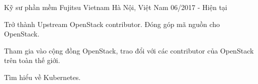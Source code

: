 \begin{cventries}
  \cventry
    {Kỹ sư phần mềm} %
    {Fujitsu Vietnam} %
    {Hà Nội, Việt Nam} %
    {06/2017 - Hiện tại} %
    {
      \begin{cvitems} %
        \item {Trở thành Upstream OpenStack contributor. Đóng góp mã nguồn cho OpenStack.}
        \item {Tham gia vào cộng đồng OpenStack, trao đổi với các contributor của OpenStack trên toàn thế giới.}
        \item {Tìm hiểu về Kubernetes.}
      \end{cvitems}
    }

\end{cventries}
